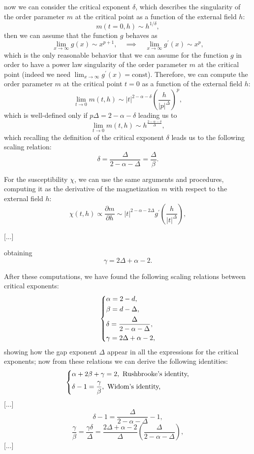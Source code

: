 now we can consider the critical exponent \(\delta\), which describes the singularity of the order parameter \(m\) at the critical point as a function of the external field \(h\):
\[
    m(t=0,h) \sim h^{1/\delta},
\]
then we can assume that the function \(g\) behaves as
\[
    \lim_{x \to \infty} g(x) \sim x^{p+1}, \quad \implies \quad \lim_{x \to \infty} g^{\prime}(x) \sim x^p,
\]
which is the only reasonable behavior that we can assume for the function \(g\) in order to have a power law singularity of the order parameter \(m\) at the critical point (indeed we need \(\lim_{x \to \infty} g^{\prime}(x) = \text{const}\)). Therefore, we can compute the order parameter \(m\) at the critical point \(t=0\) as a function of the external field \(h\):
\[
    \lim_{t \to 0} m(t,h) \sim \vert t \vert^{2-\alpha-\delta} \left(\frac{h}{\vert p \vert^{\Delta}}\right)^{p},
\]
which is well-defined only if \(p \Delta = 2 - \alpha - \delta\) leading us to
\[
    \lim_{t \to 0} m(t,h) \sim h^{\frac{2-\alpha-\delta}{\Delta}},
\]
which recalling the definition of the critical exponent \(\delta\) leads us to the following scaling relation:
\[
    \delta = \frac{\Delta}{2-\alpha-\Delta} = \frac{\Delta}{\beta}.
\]

For the susceptibility \(\chi\), we can use the same arguments and procedures, computing it as the derivative of the magnetization \(m\) with respect to the external field \(h\):
\[
    \chi(t,h) \propto \frac{\partial m}{\partial h} \sim \vert t \vert^{2-\alpha-2\Delta} g^{\prime}\left(\frac{h}{\vert t \vert^{\Delta}}\right),
\]

[...]

obtaining
\[
    \gamma = 2\Delta + \alpha - 2.
\]


After these computations, we have found the following scaling relations between critical exponents:
\[
    \begin{dcases}
        \alpha = 2 - d,                          \\
        \beta = d - \Delta,                      \\
        \delta = \frac{\Delta}{2-\alpha-\Delta}, \\
        \gamma = 2\Delta + \alpha - 2,
    \end{dcases}
\]
showing how the gap exponent \(\Delta\) appear in all the expressions for the critical exponents; now from these relations we can derive the following identities:
\[
    \begin{dcases}
        \alpha + 2\beta + \gamma = 2, \text{ Rushbrooke's identity,} \\
        \delta - 1 = \frac{\gamma}{\beta}, \text{ Widom's identity,} \\
    \end{dcases}
\]
[...]
\[
    \delta - 1 = \frac{\Delta}{2 - \alpha - \Delta} - 1,
\]
\[
    \frac{\gamma}{\beta} = \frac{\gamma \delta}{\Delta} = \frac{2\Delta + \alpha - 2}{\Delta} \left(\frac{\Delta}{2 - \alpha - \Delta}\right),
\]
[...]

